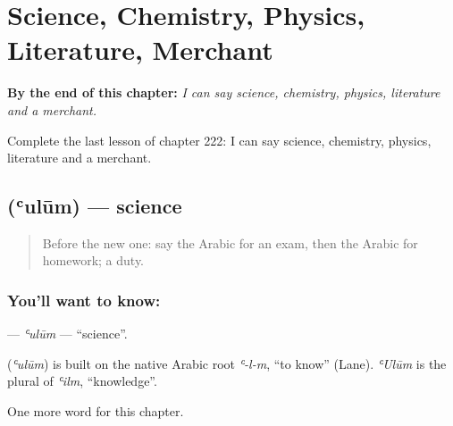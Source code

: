 
\chapter{Science, Chemistry, Physics, Literature, Merchant}
\label{ch:ar-science-chemistry-physics-literature-merchant}

\begin{chapteropening}
\textbf{By the end of this chapter:} \emph{I can say science, chemistry, physics, literature and a merchant.}

Complete the last lesson of chapter 222: I can say science, chemistry, physics, literature and a merchant.
\end{chapteropening}

\section[\texorpdfstring{\ar{علوم} (ʿulūm)}{علوم (ʿulūm)}]{ (ʿulūm) — science}

\label{lesson:AR-C222-ulum}



\begin{quote}
Before the new one: say the Arabic for an exam, then the Arabic for homework; a duty.
\end{quote}

\subsection*{You'll want to know: }
\textbf{} — \emph{ʿulūm} — \textquotedblleft{}science\textquotedblright{}.

\begin{cousinweb}
\textbf{} (\emph{ʿulūm}) is built on the native Arabic root \emph{ʿ-l-m}, \textquotedblleft{}to know\textquotedblright{} (Lane). \emph{ʿUlūm} is the plural of \emph{ʿilm}, \textquotedblleft{}knowledge\textquotedblright{}.
\end{cousinweb}

\begin{grammarlens}[title={What you've built}]
One more word for this chapter.
\end{grammarlens}


